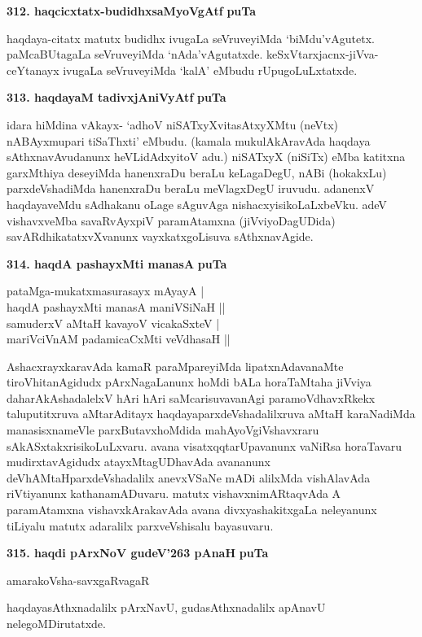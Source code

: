 {\noindent
\textbf{312. haqcicxtatx-budidhxsaMyoVgAtf} \hfill {\bf puTa \pageref{161}}

\smallskip
haqdaya-citatx matutx budidhx ivugaLa seVruveyiMda  `biMdu'vAgutetx. paMcaBUtagaLa seVruveyiMda `nAda'vAgutatxde. keSxVtarxjacnx-jiVva-ceYtanayx ivugaLa seVruveyiMda  `kalA' eMbudu rUpugoLuLxtatxde.

\medskip
\noindent
\textbf{313. haqdayaM tadivxjAniVyAtf} \hfill {\bf puTa \pageref{186}}

\smallskip
idara hiMdina vAkayx- `adhoV niSATxyXvitasAtxyXMtu (neVtx) nABAyxmupari tiSaThxti' eMbudu. (kamala\- mukulAkAravAda haqdaya sAthxnavAvudanunx heVLi\-dAdxyitoV adu.) niSATxyX (niSiTx) eMba katitxna garxMthi\-ya deseyiMda hanenxraDu beraLu keLa\-gaDegU, nABi (hokakxLu) parxdeVshadiMda hanenxraDu beraLu meVlagx\-DegU iruvudu. adanenxV haqdayaveMdu sAdhakanu oLage sAguvAga nishacxyisikoLaLxbeVku. adeV vishavxveMba savaRvAyxpiV paramAtamxna (jiVviyoDagUDida) savARdhikatatxvXvanunx vayxkatxgoLisuva sAthxnavAgide.

\medskip
\noindent
\textbf{314. haqdA pashayxMti manasA} \hfill {\bf puTa \pageref{205}}

\begin{shloka}
pataMga-mukatxmasurasayx mAyayA |\\
haqdA pashayxMti manasA maniVSiNaH ||\\
samuderxV aMtaH kavayoV vicakaSxteV |\\
mariVciVnAM padamicaCxMti veVdhasaH ||
\end{shloka}


AshacxrayxkaravAda kamaR paraMpareyiMda lipatxnAdavanaMte tiroVhitanAgidudx pArxNagaLanunx hoMdi \-bALa horaTaMtaha jiVviya daharAkAshadalelxV hAri hAri saMcarisuvavanAgi paramoVdhavxRkekx talupu\-titxruva aMtarAditayx haqdayaparxdeVsha\break\-dalilxruva aMtaH karaNadiMda manasisxnameVle parxButavxhoMdida mahA\-yoVgiV\-shavxraru sAkASxtakxrisikoLuLxvaru. avana visatxqqtarUpavanunx vaNiRsa horaTavaru mudirxta\-vAgidudx atayxMta\-gUDhavAda avananunx deVhAMtaHparxdeVshadalilx anevxVSaNe mADi alilxMda vishAlavAda riVtiyanunx kathanamADuvaru. matutx vishavxnimARtaqvAda A paramAtamxna vishavxkArakavAda avana divxyashakitxgaLa nele\-yanunx tiLiyalu matutx adaralilx parxveVshisalu bayasuvaru.

\medskip
\noindent
\textbf{315. haqdi pArxNoV gudeV\char'263 pAnaH} \hfill {\bf puTa \pageref{page186}}

\hfill amarakoVsha-savxgaRvagaR

\smallskip
haqdayasAthxnadalilx pArxNavU, gudasAthxnadalilx apAnavU nelegoMDirutatxde.

}
